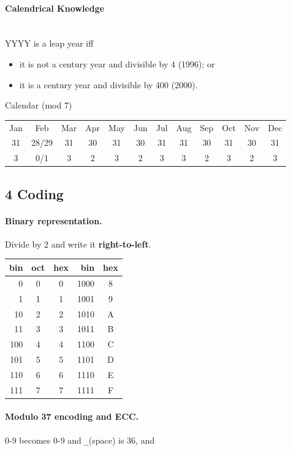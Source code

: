 \documentclass[11pt,twocolumn]{scrartcl}
\begin{document}
\paragraph{Calendrical Knowledge} \hfill\\
YYYY is a leap year iff
\begin{itemize}
    \item it is not a century year and divisible by 4 (1996); or
    \item it is a century year and divisible by 400 (2000).
\end{itemize}
Calendar (mod 7)\\
\begin{tabular}{| c | c | c | c | c | c | c | c | c | c | c | c |}
    \hline
    Jan & Feb & Mar & Apr & May & Jun & Jul & Aug & Sep & Oct & Nov & Dec\\
    31 & 28/29& 31  & 30  & 31  & 30  & 31  & 31  & 30  & 31  & 30  & 31 \\
    3  & 0/1  & 3   & 2   & 3   & 2   & 3   & 3   & 2   & 3   & 2   & 3 \\
    \hline
\end{tabular}

\newpage
\subsection*{4 Coding}
\paragraph{Binary representation.} Divide by 2 and write it \textbf{right-to-left}.

\begin{tabular}{| r | c | c || r | c |}
    \hline
    bin & oct & hex & bin & hex\\
    \hline
    0   & 0     & 0 &1000 & 8 \\
    1   & 1     & 1 &1001 & 9 \\
    10  & 2     & 2 &1010 & A \\
    11  & 3     & 3 &1011 & B \\
    100 & 4     & 4 &1100 & C \\
    101 & 5     & 5 &1101 & D \\
    110 & 6     & 6 &1110 & E \\
    111 & 7     & 7 &1111 & F \\
    \hline
\end{tabular}

\paragraph{Modulo 37 encoding and ECC.} 0-9 becomes 0-9 and \verb|_|(space) is 36, and
\end{document}
